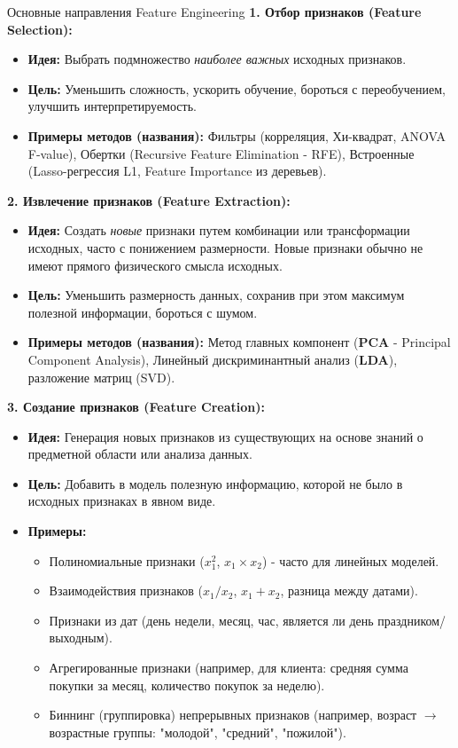 \begin{textbox}{Основные направления Feature Engineering}
    \textbf{1. Отбор признаков (Feature Selection):}
    \begin{itemize}
        \item \textbf{Идея:} Выбрать подмножество \textit{наиболее важных} исходных признаков.
        \item \textbf{Цель:} Уменьшить сложность, ускорить обучение, бороться с переобучением, улучшить интерпретируемость.
        \item \textbf{Примеры методов (названия):} Фильтры (корреляция, Хи-квадрат, ANOVA F-value), Обертки (Recursive Feature Elimination - RFE), Встроенные (Lasso-регрессия L1, Feature Importance из деревьев).
    \end{itemize}

    \textbf{2. Извлечение признаков (Feature Extraction):}
    \begin{itemize}
        \item \textbf{Идея:} Создать \textit{новые} признаки путем комбинации или трансформации исходных, часто с понижением размерности. Новые признаки обычно не имеют прямого физического смысла исходных.
        \item \textbf{Цель:} Уменьшить размерность данных, сохранив при этом максимум полезной информации, бороться с шумом.
        \item \textbf{Примеры методов (названия):} Метод главных компонент (\textbf{PCA} - Principal Component Analysis), Линейный дискриминантный анализ (\textbf{LDA}), разложение матриц (SVD).
    \end{itemize}

    \textbf{3. Создание признаков (Feature Creation):}
    \begin{itemize}
        \item \textbf{Идея:} Генерация новых признаков из существующих на основе знаний о предметной области или анализа данных.
        \item \textbf{Цель:} Добавить в модель полезную информацию, которой не было в исходных признаках в явном виде.
        \item \textbf{Примеры:}
            \begin{itemize}
                \item Полиномиальные признаки ($x_1^2$, $x_1 \times x_2$) - часто для линейных моделей.
                \item Взаимодействия признаков ($x_1 / x_2$, $x_1 + x_2$, разница между датами).
                \item Признаки из дат (день недели, месяц, час, является ли день праздником/выходным).
                \item Агрегированные признаки (например, для клиента: средняя сумма покупки за месяц, количество покупок за неделю).
                \item Биннинг (группировка) непрерывных признаков (например, возраст $\rightarrow$ возрастные группы: "молодой", "средний", "пожилой").
            \end{itemize}
    \end{itemize}
\end{textbox}

